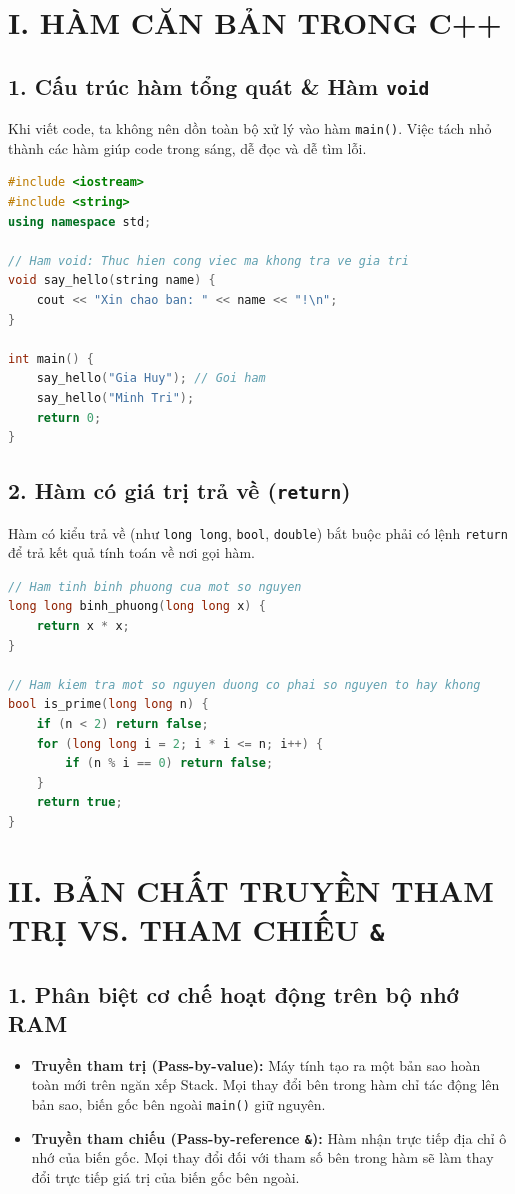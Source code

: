\documentclass[11pt,a4paper]{article}
\begin{document}
\section*{\color{AsianDarkBlue}I. HÀM CĂN BẢN TRONG C++}

\subsection*{\color{AsianBlue}1. Cấu trúc hàm tổng quát \& Hàm \texttt{void}}
Khi viết code, ta không nên dồn toàn bộ xử lý vào hàm \texttt{main()}. Việc tách nhỏ thành các hàm giúp code trong sáng, dễ đọc và dễ tìm lỗi.
\begin{lstlisting}[language=C++]
#include <iostream>
#include <string>
using namespace std;

// Ham void: Thuc hien cong viec ma khong tra ve gia tri
void say_hello(string name) {
    cout << "Xin chao ban: " << name << "!\n";
}

int main() {
    say_hello("Gia Huy"); // Goi ham
    say_hello("Minh Tri");
    return 0;
}
\end{lstlisting}

\subsection*{\color{AsianBlue}2. Hàm có giá trị trả về (\texttt{return})}
Hàm có kiểu trả về (như \texttt{long long}, \texttt{bool}, \texttt{double}) bắt buộc phải có lệnh \texttt{return} để trả kết quả tính toán về nơi gọi hàm.
\begin{lstlisting}[language=C++]
// Ham tinh binh phuong cua mot so nguyen
long long binh_phuong(long long x) {
    return x * x;
}

// Ham kiem tra mot so nguyen duong co phai so nguyen to hay khong
bool is_prime(long long n) {
    if (n < 2) return false;
    for (long long i = 2; i * i <= n; i++) {
        if (n % i == 0) return false;
    }
    return true;
}
\end{lstlisting}

\newpage
\section*{\color{AsianDarkBlue}II. BẢN CHẤT TRUYỀN THAM TRỊ VS. THAM CHIẾU \texttt{\&}}

\subsection*{\color{AsianBlue}1. Phân biệt cơ chế hoạt động trên bộ nhớ RAM}
\begin{itemize}
    \setlength{\itemsep}{1pt}
    \item \textbf{Truyền tham trị (Pass-by-value):} Máy tính tạo ra một bản sao hoàn toàn mới trên ngăn xếp Stack. Mọi thay đổi bên trong hàm chỉ tác động lên bản sao, biến gốc bên ngoài \texttt{main()} giữ nguyên.
    \item \textbf{Truyền tham chiếu (Pass-by-reference \texttt{\&}):} Hàm nhận trực tiếp địa chỉ ô nhớ của biến gốc. Mọi thay đổi đối với tham số bên trong hàm sẽ làm thay đổi trực tiếp giá trị của biến gốc bên ngoài.
\end{itemize}
\end{document}
